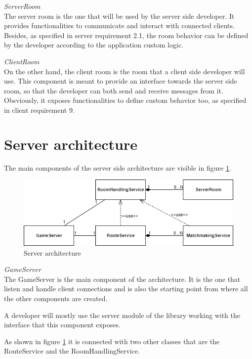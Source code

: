 \bigskip
\textit{ServerRoom}
\\
The server room is the one that will be used by the server side developer. It provides functionalities to communicate and interact with connected clients. Besides, as specified in server requirement 2.1, the room behavior can be defined by the developer according to the application custom logic.

\bigskip
\textit{ClientRoom}
\\
On the other hand, the client room is the room that a client side developer will use. This component is meant to provide an interface towards the server side room, so that the developer can both send and receive messages from it. Obsviously, it exposes functionalities to define custom behavior too, as specified in client requirement 9.

\section{Server architecture} \label{sec:server_arch}
The main components of the server side architecture are visible in figure \ref{fig:server_classes}. 

\begin{figure}[H]
	\centering
	\includegraphics[scale=0.7]{images/3-architecture/server-architecture.png}
	\caption{Server architecture}
	\label{fig:server_classes}
\end{figure}

\bigskip
\textit{GameServer}
\\
The GameServer is the main component of the architecture. It is the one that listen and handle client connections and is also the starting point from where all the other components are created.

A developer will mostly use the server module of the library working with the interface that this component exposes.

As shown in figure \ref{fig:server_classes} it is connected with two other classes that are the RouteService and the RoomHandlingService.

